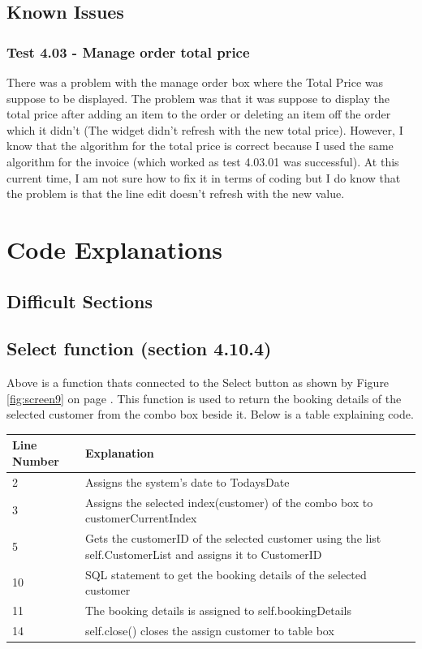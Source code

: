 {\subsection{Known Issues}

\subsubsection{Test 4.03 - Manage order total price}
There was a problem with the manage order box where the Total Price was suppose to be displayed. The problem was that it was suppose to display the total price after adding an item to the order or deleting an item off the order which it didn't (The widget didn't refresh with the new total price). However, I know that the algorithm for the total price is correct because I used the same algorithm for the invoice (which worked as test 4.03.01 was successful). At this current time, I am not sure how to fix it in terms of coding but I do know that the problem is that the line edit doesn't refresh with the new value.


\section{Code Explanations}

\subsection{Difficult Sections}

\newpage
\subsection{Select function (section 4.10.4)}

Above is a function thats connected to the Select button as shown by Figure \ref{fig:screen9} on page \pageref{fig:screen9}. This function is used to return the booking details of the selected customer from the combo box beside it. Below is a table explaining code.


\begin{center}
\begin{tabular}{|p{5cm}|p{7.5cm}|}
\hline
\textbf{Line Number} & \textbf{Explanation} \\ \hline
2 & Assigns the system's date to TodaysDate \\ \hline
3 & Assigns the selected index(customer) of the combo box to customerCurrentIndex \\ \hline
5 & Gets the customerID of the selected customer using the list self.CustomerList and assigns it to CustomerID \\ \hline
10 & SQL statement to get the booking details of the selected customer  \\ \hline
11 & The booking details is assigned to self.bookingDetails \\ \hline
14 & self.close() closes the assign customer to table box \\ \hline


\end{tabular}
\end{center}}
